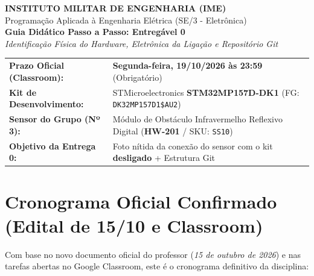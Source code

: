 \documentclass[11pt,a4paper]{article}
\begin{document}
\begin{center}
    {\Large \textbf{INSTITUTO MILITAR DE ENGENHARIA (IME)}}\\[0.15cm]
    {\large Programação Aplicada à Engenharia Elétrica (SE/3 - Eletrônica)}\\[0.1cm]
    {\Large \textbf{Guia Didático Passo a Passo: Entregável 0}}\\[0.1cm]
    {\normalsize \textit{Identificação Física do Hardware, Eletrônica da Ligação e Repositório Git}}\\[0.3cm]
    \begin{tabular}{lp{10.8cm}}
        \toprule
        \textbf{Prazo Oficial (Classroom):} & \textbf{Segunda-feira, 19/10/2026 às 23:59} (Obrigatório) \\
        \textbf{Kit de Desenvolvimento:} & STMicroelectronics \textbf{STM32MP157D-DK1} (FG: \texttt{DK32MP157D1\$AU2}) \\
        \textbf{Sensor do Grupo (Nº 3):} & Módulo de Obstáculo Infravermelho Reflexivo Digital (\textbf{HW-201} / SKU: \texttt{SS10}) \\
        \textbf{Objetivo da Entrega 0:} & Foto nítida da conexão do sensor com o kit \textbf{desligado} + Estrutura Git \\
        \bottomrule
    \end{tabular}
\end{center}

\vspace{0.2cm}

\section{Cronograma Oficial Confirmado (Edital de 15/10 e Classroom)}

Com base no novo documento oficial do professor (\textit{15 de outubro de 2026}) e nas tarefas abertas no Google Classroom, este é o cronograma definitivo da disciplina:
\end{document}
